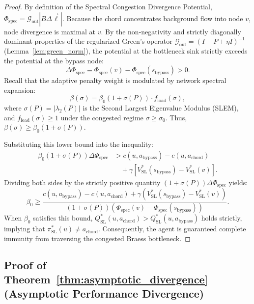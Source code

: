 \documentclass[11pt,a4paper]{article}
\begin{document}
\begin{proof}
By definition of the Spectral Congestion Divergence Potential, $\Phi_{\text{spec}} = \mathcal{G}_{\text{out}} |B \Delta \vec{\ell}|$. Because the chord concentrates background flow into node $v$, node divergence is maximal at $v$. By the non-negativity and strictly diagonally dominant properties of the regularized Green's operator $\mathcal{G}_{\text{out}} = (I - P + \eta I)^{-1}$ (Lemma~\ref{lem:green_norm}), the potential at the bottleneck sink strictly exceeds the potential at the bypass node:
\begin{equation}
\Delta \Phi_{\text{spec}} \equiv \Phi_{\text{spec}}(v) - \Phi_{\text{spec}}(s_{\text{bypass}}) > 0.
\end{equation}
Recall that the adaptive penalty weight is modulated by network spectral expansion:
\begin{equation}
\beta(\sigma) = \beta_0 (1 + \sigma(P)) \cdot f_{\text{load}}(\sigma),
\end{equation}
where $\sigma(P) = |\lambda_2(P)|$ is the Second Largest Eigenvalue Modulus (SLEM), and $f_{\text{load}}(\sigma) \ge 1$ under the congested regime $\sigma \ge \sigma_0$. Thus, $\beta(\sigma) \ge \beta_0 (1 + \sigma(P))$.

Substituting this lower bound into the inequality:
\begin{equation}
\begin{split}
\beta_0 (1 + \sigma(P)) \Delta \Phi_{\text{spec}} &> c(u, a_{\text{bypass}}) - c(u, a_{\text{chord}}) \\
&\quad + \gamma \left[ V_{\text{SL}}^*(s_{\text{bypass}}) - V_{\text{SL}}^*(v) \right].
\end{split}
\end{equation}
Dividing both sides by the strictly positive quantity $(1 + \sigma(P)) \Delta \Phi_{\text{spec}}$ yields:
\begin{equation}
\beta_0 \ge \frac{c(u, a_{\text{bypass}}) - c(u, a_{\text{chord}}) + \gamma \left( V_{\text{SL}}^*(s_{\text{bypass}}) - V_{\text{SL}}^*(v) \right)}{(1 + \sigma(P)) \left( \Phi_{\text{spec}}(v) - \Phi_{\text{spec}}(s_{\text{bypass}}) \right)}.
\end{equation}
When $\beta_0$ satisfies this bound, $Q_{\text{SL}}^*(u, a_{\text{chord}}) > Q_{\text{SL}}^*(u, a_{\text{bypass}})$ holds strictly, implying that $\pi_{\text{SL}}^*(u) \ne a_{\text{chord}}$. Consequently, the agent is guaranteed complete immunity from traversing the congested Braess bottleneck.
\end{proof}

\subsection{Proof of Theorem~\ref{thm:asymptotic_divergence} (Asymptotic Performance Divergence)}
\label{subsec:proof_thm4}
\end{document}
